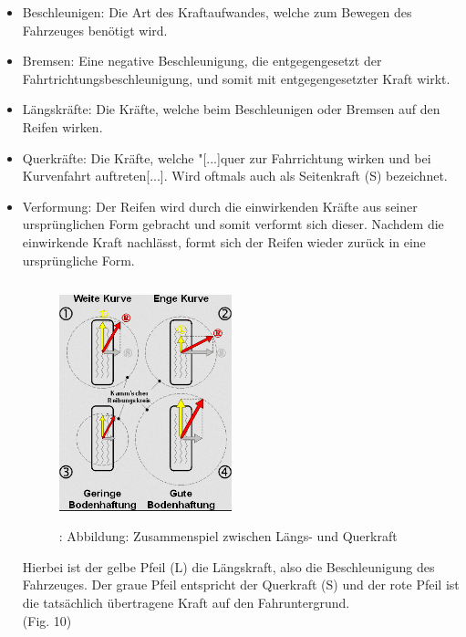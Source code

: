 	\begin{itemize}
		\item Beschleunigen: Die Art des Kraftaufwandes, welche zum Bewegen des Fahrzeuges benötigt wird.
		\item Bremsen: Eine negative Beschleunigung, die entgegengesetzt der Fahrtrichtungsbeschleunigung, und somit mit entgegengesetzter Kraft wirkt.
		\item Längskräfte: Die Kräfte, welche beim Beschleunigen oder Bremsen auf den Reifen wirken.
		\item Querkräfte: Die Kräfte, welche "[...]quer zur Fahrrichtung wirken und bei Kurvenfahrt auftreten[...].\cite{TS_swt} Wird oftmals auch als Seitenkraft (S) bezeichnet.
		\item Verformung: Der Reifen wird durch die einwirkenden Kräfte aus seiner ursprünglichen Form gebracht und somit verformt sich dieser. Nachdem die einwirkende Kraft nachlässt, formt sich der Reifen wieder zurück in eine ursprüngliche Form.
		
		\begin{figure}
			\centering
			\includegraphics[width=5cm, height=7cm] {l_qkraft.png}
			\caption {\cite{TS_l_q_k_pic}: Abbildung: Zusammenspiel zwischen Längs- und Querkraft}
		\end{figure}
		
		\begin{flushleft}
			Hierbei ist der gelbe Pfeil (L) die Längskraft, also die Beschleunigung des Fahrzeuges.
			Der graue Pfeil entspricht der Querkraft (S) und der rote Pfeil ist die tatsächlich übertragene Kraft auf den Fahruntergrund.\\ (Fig. 10)
		\end{flushleft}
		
	\end{itemize}
	
